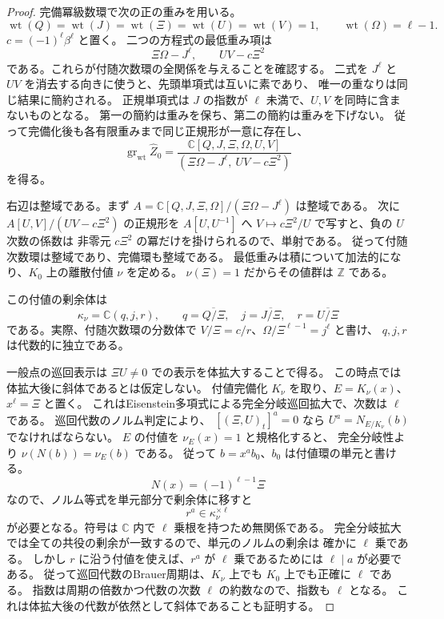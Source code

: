 \begin{proof}
完備冪級数環で次の正の重みを用いる。
\begin{equation}\label{eq:deepest-valuation-weights-v40}
 \operatorname{wt}(Q)=\operatorname{wt}(J)=\operatorname{wt}(\Xi)
 =\operatorname{wt}(U)=\operatorname{wt}(V)=1,
 \qquad \operatorname{wt}(\Omega)=\ell-1.
\end{equation}
$c=(-1)^\ell\beta^\ell$ と置く。
二つの方程式の最低重み項は
\[
 \Xi\Omega-J^\ell,\qquad UV-c\Xi^2
\]
である。これらが付随次数環の全関係を与えることを確認する。
二式を $J^\ell$ と $UV$ を消去する向きに使うと、先頭単項式は互いに素であり、
唯一の重なりは同じ結果に簡約される。
正規単項式は $J$ の指数が $\ell$ 未満で、$U,V$ を同時に含まないものとなる。
第一の簡約は重みを保ち、第二の簡約は重みを下げない。
従って完備化後も各有限重みまで同じ正規形が一意に存在し、
\begin{equation}\label{eq:deepest-associated-graded-v40}
 \operatorname{gr}_{\mathrm{wt}}\widehat Z_0
 =\frac{\mathbb C[Q,J,\Xi,\Omega,U,V]}
 {(\Xi\Omega-J^\ell,\ UV-c\Xi^2)}
\end{equation}
を得る。

右辺は整域である。まず
$A=\mathbb C[Q,J,\Xi,\Omega]/(\Xi\Omega-J^\ell)$ は整域である。
次に $A[U,V]/(UV-c\Xi^2)$ の正規形を $A[U,U^{-1}]$ へ
$V\mapsto c\Xi^2/U$ で写すと、負の $U$ 次数の係数は
非零元 $c\Xi^2$ の冪だけを掛けられるので、単射である。
従って付随次数環は整域であり、完備環も整域である。
最低重みは積について加法的になり、$K_0$ 上の離散付値 $\nu$ を定める。
$\nu(\Xi)=1$ だからその値群は $\mathbb Z$ である。

この付値の剰余体は
\begin{equation}\label{eq:deepest-residue-field-v40}
 \kappa_\nu=\mathbb C(q,j,r),\qquad
 q=\overline{Q/\Xi},\quad j=\overline{J/\Xi},\quad r=\overline{U/\Xi}
\end{equation}
である。実際、付随次数環の分数体で
$V/\Xi=c/r$、$\Omega/\Xi^{\ell-1}=j^\ell$ と書け、
$q,j,r$ は代数的に独立である。

一般点の巡回表示は $\Xi U\ne0$ での表示を体拡大することで得る。
この時点では体拡大後に斜体であるとは仮定しない。
付値完備化 $K_\nu$ を取り、$E=K_\nu(x)$、$x^\ell=\Xi$ と置く。
これはEisenstein多項式による完全分岐巡回拡大で、次数は $\ell$ である。
巡回代数のノルム判定\cite[\S1, equation~(2)]{MinacSchultzSwallowDescent39}により、
$[(\Xi,U)_t]^a=0$ なら $U^a=N_{E/K_\nu}(b)$ でなければならない。
$E$ の付値を $\nu_E(x)=1$ と規格化すると、
完全分岐性より $\nu(N(b))=\nu_E(b)$ である。
従って $b=x^a b_0$、$b_0$ は付値環の単元と書ける。
\[
 N(x)=(-1)^{\ell-1}\Xi
\]
なので、ノルム等式を単元部分で剰余体に移すと
\[
 r^a\in\kappa_\nu^{\times\ell}
\]
が必要となる。符号は $\mathbb C$ 内で $\ell$ 乗根を持つため無関係である。
完全分岐拡大では全ての共役の剰余が一致するので、単元のノルムの剰余は
確かに $\ell$ 乗である。
しかし $r$ に沿う付値を使えば、$r^a$ が $\ell$ 乗であるためには
$\ell\mid a$ が必要である。
従って巡回代数のBrauer周期は、$K_\nu$ 上でも $K_0$ 上でも正確に $\ell$ である。
指数は周期の倍数かつ代数の次数 $\ell$ の約数なので、指数も $\ell$ となる。
これは体拡大後の代数が依然として斜体であることも証明する。


\end{proof}
